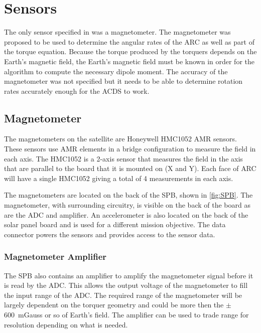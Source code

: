 

\section{Sensors}

The only sensor specified in \cite{Mentch11} was a magnetometer. The magnetometer was proposed to be used to determine the angular rates of the \ac{ARC} as well as part of the torque equation. Because the torque produced by the torquers depends on the Earth's magnetic field, the Earth's magnetic field must be known in order for the algorithm to compute the necessary dipole moment. The accuracy of the magnetometer was not specified but it needs to be able to determine rotation rates accurately enough for the \ac{ACDS} to work.

\subsection{Magnetometer}

The magnetometers on the satellite are Honeywell HMC1052 \ac{AMR} sensors. These sensors use \ac{AMR} elements in a bridge configuration to measure the field in each axis. The HMC1052 is a 2-axis sensor that measures the field in the axis that are parallel to the board that it is mounted on (X and Y). Each face of \ac{ARC} will have a single HMC1052 giving a total of 4 measurements in each axis.

The magnetometers are located on the back of the \acs{SPB}, shown in \cref{fig:SPB}. The magnetometer, with surrounding circuitry, is visible on the back of the board as are the ADC and amplifier. An accelerometer is also located on the back of the solar panel board and is used for a different mission objective. The data connector powers the sensors and provides access to the sensor data.

\subsubsection{Magnetometer Amplifier}


The \ac{SPB} also contains an amplifier to amplify the magnetometer signal before it is read by the \ac{ADC}. This allows the output voltage of the magnetometer to fill the input range of the \ac{ADC}. The required range of the magnetometer will be largely dependent on the torquer geometry and could be more then the $\pm$600~mGauss or so of Earth's field. The amplifier can be used to trade range for resolution depending on what is needed.

